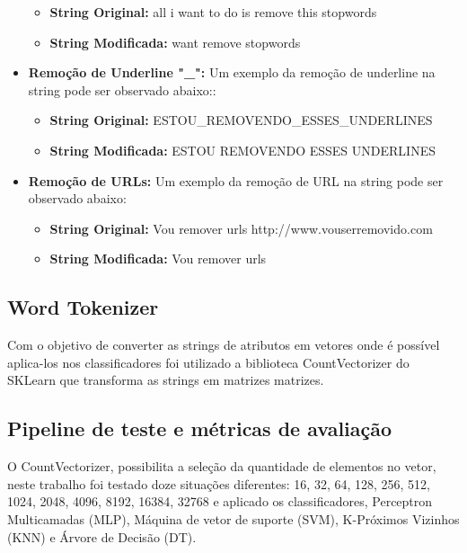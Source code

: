\documentclass[conference]{IEEEtran}
\begin{document}
\begin{itemize}
			\begin{itemize}
				\item \textbf{String Original:} all i want to do is remove this stopwords
				\item \textbf{String Modificada:} want remove stopwords
			\end{itemize}
			
			\vspace{0.2cm}
			\item \textbf{Remoção de Underline "\_":} Um exemplo da remoção de underline na string pode ser observado abaixo::

			\begin{itemize}
				\item \textbf{String Original:} ESTOU\_REMOVENDO\_ESSES\_UNDERLINES
				\item \textbf{String Modificada:} ESTOU REMOVENDO ESSES UNDERLINES
			\end{itemize}		
			
			\vspace{0.2cm}
			\item \textbf{Remoção de URLs:} Um exemplo da remoção de URL na string pode ser observado abaixo:
			\begin{itemize}
				\item \textbf{String Original:} Vou remover urls http://www.vouserremovido.com
				\item \textbf{String Modificada:} Vou remover urls
			\end{itemize}
		
		\end{itemize}
	
	\subsection{Word Tokenizer}
		Com o objetivo de converter as strings de atributos em vetores onde é possível aplica-los nos classificadores foi utilizado a biblioteca CountVectorizer do SKLearn que transforma as strings em matrizes matrizes. 
	
	\subsection{Pipeline de teste e métricas de avaliação}\label{sec:pipeline}
		O CountVectorizer, possibilita a seleção da quantidade de elementos no vetor, neste trabalho foi testado doze situações diferentes: 16, 32, 64, 128, 256, 512, 1024, 2048, 4096, 8192, 16384, 32768 e aplicado os classificadores, Perceptron Multicamadas (MLP), Máquina de vetor de suporte (SVM), K-Próximos Vizinhos (KNN) e Árvore de Decisão (DT).
		
\end{document}
